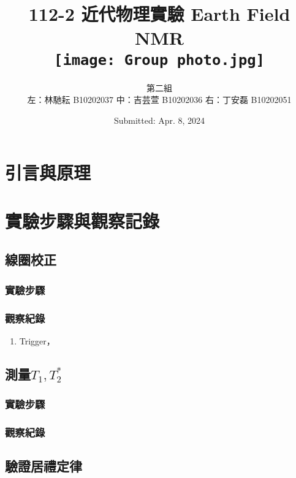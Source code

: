 \documentclass[twocolumn]{article}
\title{112-2 近代物理實驗 Earth Field NMR\\\vspace{1cm}
\texttt{[image: Group photo.jpg]}}
\author{第二組 \\ 左：林馳耘 B10202037 中：吉芸萱 B10202036 右：丁安磊 B10202051}
\date{Submitted: Apr. 8, 2024}
\begin{document}
\newcommand{\momega}{~{\rm m}\Omega}
\renewcommand{\figurename}{圖}
\renewcommand{\tablename}{表}
\newcommand{\br}[1]{\left(#1\right)}
\renewcommand{\vb}[1]{\boldsymbol{\mathbf{#1}}} %
\newcommand\inlineeqno{\refstepcounter{equation}~~ \hspace*{\fill} \mbox{(\theequation)}}

\maketitle

\section{引言與原理}



\section{實驗步驟與觀察記錄}

\subsection{線圈校正}
\subsubsection*{實驗步驟}
\subsubsection*{觀察紀錄}
\begin{enumerate}
    \item Trigger，
\end{enumerate}

\subsection{測量$T_1, T_2^*$}
\subsubsection*{實驗步驟}
\subsubsection*{觀察紀錄}

\subsection{驗證居禮定律}
\end{document}
